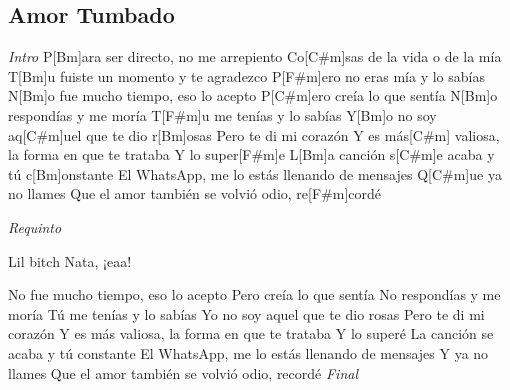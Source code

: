 \subsection{Amor Tumbado}
\noindent

\vspace{1cm}

\begin{guitar}
	\begin{multicols}{2}
		\textit{Intro}
		P[Bm]ara ser directo, no me arrepiento
		Co[C#m]sas de la vida o de la mía
		T[Bm]u fuiste un momento y te agradezco
		P[F#m]ero no eras mía y lo sabías
		N[Bm]o fue mucho tiempo, eso lo acepto
		P[C#m]ero creía lo que sentía
		N[Bm]o respondías y me moría
		T[F#m]u me tenías y lo sabías
		Y[Bm]o no soy aq[C#m]uel que te dio r[Bm]osas
	Pero te di mi corazón
	Y es más[C#m] valiosa, la forma en que te trataba
	Y lo super[F#m]e
	L[Bm]a canción s[C#m]e acaba y tú c[Bm]onstante
	El WhatsApp, me lo estás llenando de mensajes
	Q[C#m]ue ya no llames
	Que el amor también se volvió odio, re[F#m]cordé
	\par
	\textit{Requinto}
	\par
	Lil bitch
	Nata, ¡eaa!

	\par
	No fue mucho tiempo, eso lo acepto
	Pero creía lo que sentía
	No respondías y me moría
	Tú me tenías y lo sabías
	Yo no soy aquel que te dio rosas
	Pero te di mi corazón
	Y es más valiosa, la forma en que te trataba
	Y lo superé
	La canción se acaba y tú constante
	El WhatsApp, me lo estás llenando de mensajes
	Y ya no llames
	Que el amor también se volvió odio, recordé
		\textit{Final}
	\end{multicols}
\end{guitar}
